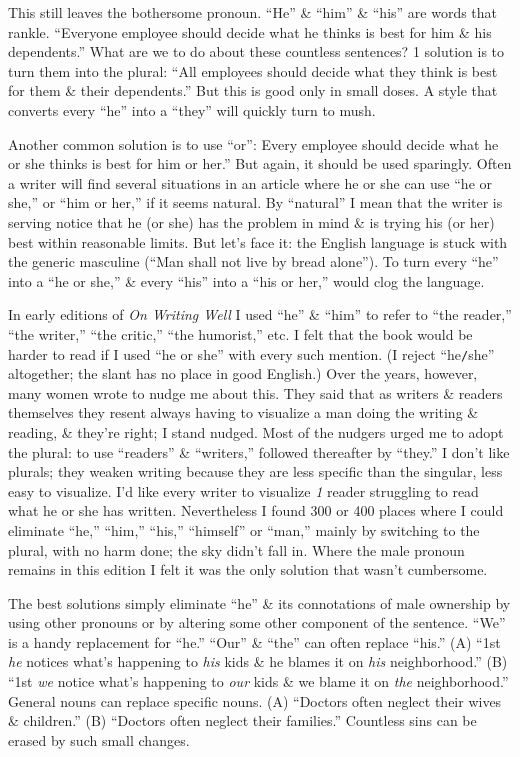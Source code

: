 \documentclass{article}
\begin{document}
This still leaves the bothersome pronoun. ``He'' \& ``him'' \& ``his'' are words that rankle. ``Everyone employee should decide what he thinks is best for him \& his dependents.'' What are we to do about these countless sentences? 1 solution is to turn them into the plural: ``All employees should decide what they think is best for them \& their dependents.'' But this is good only in small doses. A style that converts every ``he'' into a ``they'' will quickly turn to mush.

Another common solution is to use ``or'': Every employee should decide what he or she thinks is best for him or her.'' But again, it should be used sparingly. Often a writer will find several situations in an article where he or she can use ``he or she,'' or ``him or her,'' if it seems natural. By ``natural'' I mean that the writer is serving notice that he (or she) has the problem in mind \& is trying his (or her) best within reasonable limits. But let's face it: the English language is stuck with the generic masculine (``Man shall not live by bread alone''). To turn every ``he'' into a ``he or she,'' \& every ``his'' into a ``his or her,'' would clog the language.

In early editions of \textit{On Writing Well} I used ``he'' \& ``him'' to refer to ``the reader,'' ``the writer,'' ``the critic,'' ``the humorist,'' etc. I felt that the book would be harder to read if I used ``he or she'' with every such mention. (I reject ``he{\tt/}she'' altogether; the slant has no place in good English.) Over the years, however, many women wrote to nudge me about this. They said that as writers \& readers themselves they resent always having to visualize a man doing the writing \& reading, \& they're right; I stand nudged. Most of the nudgers urged me to adopt the plural: to use ``readers'' \& ``writers,'' followed thereafter by ``they.'' I don't like plurals; they weaken writing because they are less specific than the singular, less easy to visualize. I'd like every writer to visualize \textit{1} reader struggling to read what he or she has written. Nevertheless I found 300 or 400 places where I could eliminate ``he,'' ``him,'' ``his,'' ``himself'' or ``man,'' mainly by switching to the plural, with no harm done; the sky didn't fall in. Where the male pronoun remains in this edition I felt it was the only solution that wasn't cumbersome.

The best solutions simply eliminate ``he'' \& its connotations of male ownership by using other pronouns or by altering some other component of the sentence. ``We'' is a handy replacement for ``he.'' ``Our'' \& ``the'' can often replace ``his.'' (A) ``1st \textit{he} notices what's happening to \textit{his} kids \& he blames it on \textit{his} neighborhood.'' (B) ``1st \textit{we} notice what's happening to \textit{our} kids \& we blame it on \textit{the} neighborhood.'' General nouns can replace specific nouns. (A) ``Doctors often neglect their wives \& children.'' (B) ``Doctors often neglect their families.'' Countless sins can be erased by such small changes.
\end{document}

